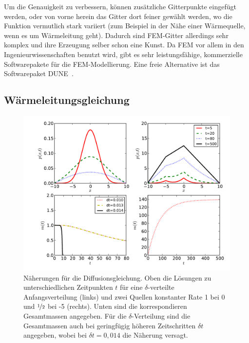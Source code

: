 Um die Genauigkeit zu verbessern, können zusätzliche Gitterpunkte
eingefügt werden, oder von vorne herein das Gitter dort feiner gewählt
werden, wo die Funktion vermutlich stark variiert (zum Beispiel in der
Nähe einer Wärmequelle, wenn es um Wärmeleitung geht). Dadurch sind
FEM-Gitter allerdings sehr komplex und ihre Erzeugung selber schon
eine Kunst. Da FEM vor allem in den Ingenieurwissenschaften benutzt
wird, gibt es sehr leistungsfähige, kommerzielle Softwarepakete für
die FEM-Modellierung. Eine freie Alternative ist das Softwarepaket
DUNE~\cite{dune,duneweb}.

\subsection{Wärmeleitungsgleichung}

\begin{figure}
  \centering
  \includegraphics[width=\textwidth]{plots/waermeleitung}
  \caption{Näherungen für die Diffusionsgleichung. Oben die Lösungen
    zu unterschiedlichen Zeitpunkten $t$ für eine $\delta$-verteilte
    Anfangsverteilung (links) und zwei Quellen konstanter Rate 1 bei 0
    und $\nicefrac{1}{2}$ bei -5 (rechts). Unten sind die
    korrespondieren Gesamtmassen angegeben. Für die
    $\delta$-Verteilung sind die Gesamtmassen auch bei geringfügig
    höheren Zeitschritten $\delta t$ angegeben, wobei bei $\delta
    t=0,014$ die Näherung versagt.}
  \label{fig:waermeleitung}
\end{figure}

